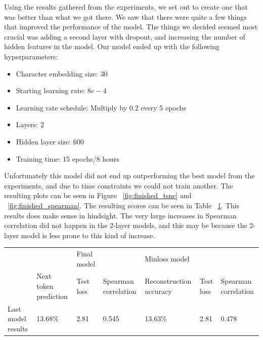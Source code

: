 Using the results gathered from the experiments, we set out to create one that was better than what we got there. We saw that there were quite a few things that improved the performance of the model. The things we decided seemed most crucial was adding a second layer with dropout, and increasing the number of hidden features in the model. Our model ended up with the following hyperparameters:
\begin{itemize}
	\item Character embedding size: 30
	\item Starting learning rate: $8e-4$
	\item Learning rate schedule: Multiply by $0.2$ every 5 epochs
	\item Layers: 2
	\item Hidden layer size: $600$
	\item Training time: 15 epochs/8 hours
\end{itemize}
Unfortunately this model did not end up outperforming the best model from the experiments, and due to time constraints we could not train another. The resulting plots can be seen in Figure ~\ref{fig:finished_tsne} and ~\ref{fig:finished_spearman}. The resulting scores can be seen in Table ~\ref{tab:finished_results}. This results does make sense in hindsight. The very large increases in Spearman correlation did not happen in the 2-layer models, and this may be because the 2-layer model is less prone to this kind of increase.

\begin{table}[]
\begin{tabular}{|l|lll|lll|}
\hline
                   &                                            & Final model                    &                      & Minloss model                                &                                &                      \\ \cline{2-7} 
                   & \multicolumn{1}{l|}{Next token prediction} & \multicolumn{1}{l|}{Test loss} & Spearman correlation & \multicolumn{1}{l|}{Reconstruction accuracy} & \multicolumn{1}{l|}{Test loss} & Spearman correlation \\ \hline
Last model results & \multicolumn{1}{l|}{13.68\%}               & \multicolumn{1}{l|}{2.81}      & 0.545                & \multicolumn{1}{l|}{13.63\%}                 & \multicolumn{1}{l|}{2.81}      & 0.478                \\ \hline
\end{tabular}
\label{tab:finished_results}
\end{table}

